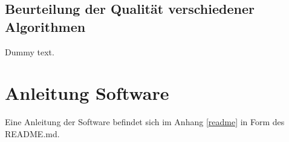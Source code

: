 \subsection{Beurteilung der Qualität verschiedener Algorithmen}

Dummy text.


\section{Anleitung Software}

Eine Anleitung der Software befindet sich im Anhang \ref{readme} in Form des README.md.

%
%
%
%
%
%
%
%
%
%

